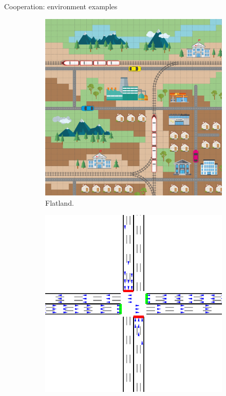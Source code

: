 \documentclass[9pt, hyperref={pdfusetitle,colorlinks=true,allcolors=DarkBlue}]{beamer}
\begin{document}
\begin{frame}{Cooperation: environment examples}
\begin{figure}

\begin{subfigure}[b]{0.33\textwidth}
        \centering
        \includegraphics[width=.95\textwidth]{flatland_visual.png}
        \caption{Flatland.}
\end{subfigure}%
\begin{subfigure}[b]{0.33\textwidth}
        \centering
        \includegraphics[width=.95\textwidth]{cityflow.png}

\end{subfigure}
\end{figure}
\end{frame}
\end{document}
